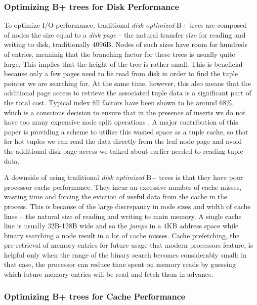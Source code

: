 \documentclass{article}
\begin{document}
\subsubsection{Optimizing B+ trees for Disk Performance}

To optimize I/O performance, traditional \textit{disk optimized} B+ trees are
composed of nodes the size equal to a \textit{disk page} -- the natural transfer
size for reading and writing to disk, traditionally 4096B.
Nodes of such sizes have room for hundreds of entries, meaninig that the
branching factor for these trees is usually quite large.
This implies that the height of the tree is rather small. This is beneficial
because only a few pages need to be read from disk in order to find the tuple
pointer we are searching for. At the same time, however, this also means that
the additional page access to retrieve the associated tuple data is a
significant part of the total cost. Typical index fill factors have been shown
to be around 68\%, which is a conscious decision to ensure that in the presence
of inserts we do not have too many expensive node split operations
\citep{Wu:2011}. A major contribution of this paper is providing a scheme to
utilize this wasted space as a tuple cache, so that for hot tuples we can read
the data directly from the leaf node page and avoid the additional disk page
access we talked about earlier needed to reading tuple data.

A downside of using traditional \textit{disk optimized} B+ trees is that they
have poor processor cache performance. They incur an excessive number of cache
misses, wasting time and forcing the eviction of useful data from the cache in
the process. This is because of the large discrepancy in node sizes and width of
cache lines -- the natural size of reading and writing to main memory. A single
cache line is usually 32B-128B wide and so the \textit{jumps} in a 4KB address
space while binary searching a node result in a lot of cache misses.
Cache prefetching, the pre-retrieval of memory entries for future usage that
modern processors feature, 
is helpful only when the range of the binary search becomes considerably small:
in that case, the processor can reduce time spent on memory reads by guessing
which future memory entries will be
read and fetch them in advance.

\subsubsection{Optimizing B+ trees for Cache Performance}
\end{document}
